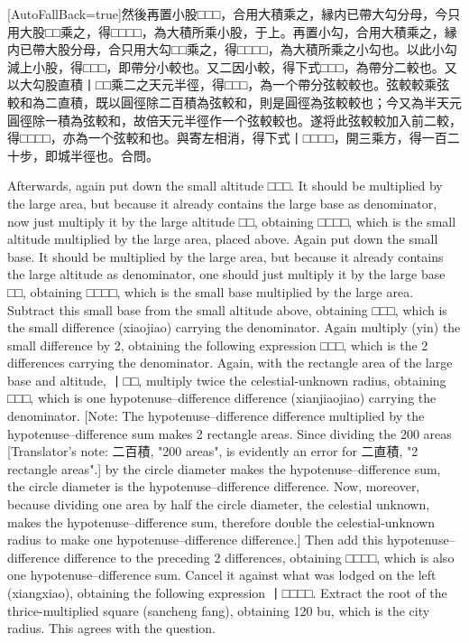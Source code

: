 \documentclass[11pt]{article}
\newcommand{\zhsmall}{\footnotesize\color{black!70}}
\newcommand{\unitlabel}[1]{\marginpar{\raggedleft\tiny\color{gray}#1}}
\newenvironment{unitzh}{\par\CJKfontspec{Noto Serif CJK SC}[AutoFallBack=true]\large\linespread{1.25}\selectfont}{\par}
\newenvironment{uniten}{\par\small\color{black!85}}{\par\medskip}
\begin{document}
\begin{unitzh}\unitlabel{ceyuan-031.2}然後再置小股□□□，合用大積乘之，縁内已帶大勾分母，今只用大股□□乘之，得□□□□，為大積所乘小股，于上。再置小勾，合用大積乘之，縁内已帶大股分母，合只用大勾□□乘之，得□□□□，為大積所乘之小勾也。以此小勾減上小股，得□□□，即帶分小較也。又二因小較，得下式□□□，為帶分二較也。又以大勾股直積丨□□乘二之天元半徑，得□□□，為一个帶分弦較較也。{\zhsmall 弦較較乘弦較和為二直積，既以圓徑除二百積為弦較和，則是圓徑為弦較較也；今又為半天元圓徑除一積為弦較和，故倍天元半徑作一个弦較較也。}遂将此弦較較加入前二較，得□□□□，亦為一个弦較和也。與寄左相消，得下式丨□□□□，開三乘方，得一百二十步，即城半徑也。合問。\end{unitzh}
\begin{uniten}Afterwards, again put down the small altitude □□□. It should be multiplied by the large area, but because it already contains the large base as denominator, now just multiply it by the large altitude □□, obtaining □□□□, which is the small altitude multiplied by the large area, placed above. Again put down the small base. It should be multiplied by the large area, but because it already contains the large altitude as denominator, one should just multiply it by the large base □□, obtaining □□□□, which is the small base multiplied by the large area. Subtract this small base from the small altitude above, obtaining □□□, which is the small difference (xiaojiao) carrying the denominator. Again multiply (yin) the small difference by 2, obtaining the following expression □□□, which is the 2 differences carrying the denominator. Again, with the rectangle area of the large base and altitude, 丨□□, multiply twice the celestial-unknown radius, obtaining □□□, which is one hypotenuse–difference difference (xianjiaojiao) carrying the denominator. [Note: The hypotenuse–difference difference multiplied by the hypotenuse–difference sum makes 2 rectangle areas. Since dividing the 200 areas [Translator's note: 二百積, "200 areas", is evidently an error for 二直積, "2 rectangle areas".] by the circle diameter makes the hypotenuse–difference sum, the circle diameter is the hypotenuse–difference difference. Now, moreover, because dividing one area by half the circle diameter, the celestial unknown, makes the hypotenuse–difference sum, therefore double the celestial-unknown radius to make one hypotenuse–difference difference.] Then add this hypotenuse–difference difference to the preceding 2 differences, obtaining □□□□, which is also one hypotenuse–difference sum. Cancel it against what was lodged on the left (xiangxiao), obtaining the following expression 丨□□□□. Extract the root of the thrice-multiplied square (sancheng fang), obtaining 120 bu, which is the city radius. This agrees with the question.\end{uniten}
\end{document}
